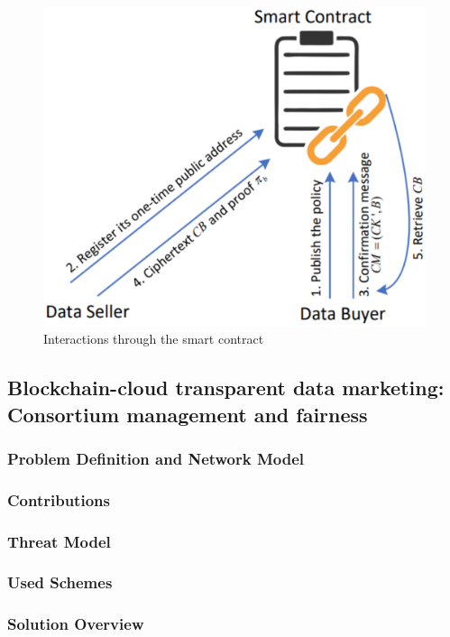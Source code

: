 \begin{figure}
\centering
  \includegraphics[width=0.8\linewidth]{imgs/23-interactions.eps}
  \caption{Interactions through the smart contract~\cite{xue2023blockchain}}
  \label{fig:23-interactions-through-smart-contract}
\end{figure}

\subsection{Blockchain-cloud transparent data marketing: Consortium management and fairness~\cite{liu2022blockchain}}
\label{sec:blockchain-cloud-trasparent-data-marketing-consortium-management}

\subsubsection{Problem Definition and Network Model}

\subsubsection{Contributions}

\subsubsection{Threat Model}

\subsubsection{Used Schemes}

\subsubsection{Solution Overview}

